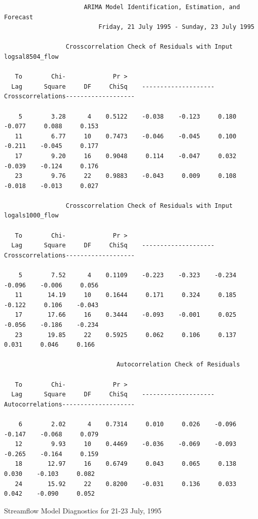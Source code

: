 \documentclass[12pt]{report}
\begin{document}
\begin{table}
\scriptsize
\begin{centering}
\begin{verbatim}
                      ARIMA Model Identification, Estimation, and Forecast
                          Friday, 21 July 1995 - Sunday, 23 July 1995

                 Crosscorrelation Check of Residuals with Input logsal8504_flow

   To        Chi-             Pr >
  Lag      Square     DF     ChiSq    --------------------Crosscorrelations-------------------

    5        3.28      4    0.5122    -0.038    -0.123     0.180    -0.077     0.088     0.153
   11        6.77     10    0.7473    -0.046    -0.045     0.100    -0.211    -0.045     0.177
   17        9.20     16    0.9048     0.114    -0.047     0.032    -0.039    -0.124     0.176
   23        9.76     22    0.9883    -0.043     0.009     0.108    -0.018    -0.013     0.027

                 Crosscorrelation Check of Residuals with Input logals1000_flow

   To        Chi-             Pr >
  Lag      Square     DF     ChiSq    --------------------Crosscorrelations-------------------

    5        7.52      4    0.1109    -0.223    -0.323    -0.234    -0.096    -0.006     0.056
   11       14.19     10    0.1644     0.171     0.324     0.185    -0.122     0.106    -0.043
   17       17.66     16    0.3444    -0.093    -0.001     0.025    -0.056    -0.186    -0.234
   23       19.85     22    0.5925     0.062     0.106     0.137     0.031     0.046     0.166

                               Autocorrelation Check of Residuals

   To        Chi-             Pr >
  Lag      Square     DF     ChiSq    --------------------Autocorrelations--------------------

    6        2.02      4    0.7314     0.010     0.026    -0.096    -0.147    -0.068     0.079
   12        9.93     10    0.4469    -0.036    -0.069    -0.093    -0.265    -0.164     0.159
   18       12.97     16    0.6749     0.043     0.065     0.138     0.030    -0.103     0.082
   24       15.92     22    0.8200    -0.031     0.136     0.033     0.042    -0.090     0.052

\end{verbatim}
\end{centering}
\normalsize\caption{Streamflow Model Diagnostics for 21-23 July,
1995 }\label{tab:JulModDiag}
\end{table}
\end{document}
